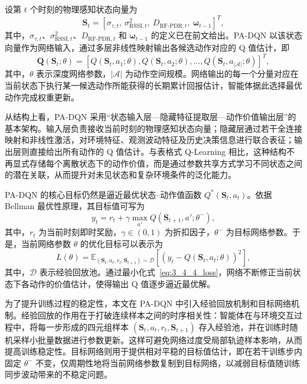 设第 \(t\) 个时刻的物理感知状态向量为
\begin{equation}
\mathbf{S}_t=
\left[
\sigma_{\tau,t},
\ \sigma^2_{\mathrm{RSSI},t},
\ D_{\mathrm{RF\mbox{-}PDR},t},
\ \boldsymbol{\omega}_{t-1}
\right]^T,
\label{eq:3_4_4_state_input}
\end{equation}
其中，\(\sigma_{\tau,t}\)、\(\sigma^2_{\mathrm{RSSI},t}\)、\(D_{\mathrm{RF\mbox{-}PDR},t}\) 和 \(\boldsymbol{\omega}_{t-1}\) 的定义已在前文给出。PA-DQN 以该状态向量作为网络输入，通过多层非线性映射输出各候选动作对应的 Q 值估计，即
\begin{equation}
\mathbf{Q}(\mathbf{S}_t;\theta)
=
\left[
Q(\mathbf{S}_t,a_1;\theta),
Q(\mathbf{S}_t,a_2;\theta),
\ldots,
Q(\mathbf{S}_t,a_{|\mathcal{A}|};\theta)
\right]^T,
\label{eq:3_4_4_q_output}
\end{equation}
其中，\(\theta\) 表示深度网络参数，\(|\mathcal{A}|\) 为动作空间规模。网络输出的每一个分量对应在当前状态下执行某一候选动作所能获得的长期累计回报估计，智能体据此选择最优动作完成权重更新。

从结构上看，PA-DQN 采用“状态输入层—隐藏特征提取层—动作价值输出层”的基本架构。输入层负责接收当前时刻的物理感知状态向量；隐藏层通过若干全连接映射和非线性激活，对环境特征、观测波动特征及历史决策信息进行联合表征；输出层则直接给出所有动作的 Q 值估计。与表格式 Q-Learning 相比，这种结构不再显式存储每个离散状态下的动作价值，而是通过参数共享方式学习不同状态之间的潜在关联，从而提升对未见状态和复杂环境条件的泛化能力。

PA-DQN 的核心目标仍然是逼近最优状态--动作值函数 \(Q^*(\mathbf{S}_t,a_t)\)。依据 Bellman 最优性原理，其目标值可写为
\begin{equation}
y_t
=
r_t+\gamma \max_{a'}Q(\mathbf{S}_{t+1},a';\theta^-),
\label{eq:3_4_4_target}
\end{equation}
其中，\(r_t\) 为当前时刻即时奖励，\(\gamma\in(0,1)\) 为折扣因子，\(\theta^-\) 为目标网络参数。于是，当前网络参数 \(\theta\) 的优化目标可以表示为
\begin{equation}
L(\theta)
=
\mathbb{E}_{(\mathbf{S}_t,a_t,r_t,\mathbf{S}_{t+1})\sim \mathcal{D}}
\left[
\left(
y_t-Q(\mathbf{S}_t,a_t;\theta)
\right)^2
\right],
\label{eq:3_4_4_loss}
\end{equation}
其中，\(\mathcal{D}\) 表示经验回放池。通过最小化式~\eqref{eq:3_4_4_loss}，网络不断修正当前状态下各动作的价值估计，使得输出 Q 值逐步逼近最优解。

为了提升训练过程的稳定性，本文在 PA-DQN 中引入经验回放机制和目标网络机制。经验回放的作用在于打破连续样本之间的时序相关性：智能体在与环境交互过程中，将每一步形成的四元组样本 \((\mathbf{S}_t,a_t,r_t,\mathbf{S}_{t+1})\) 存入经验池，并在训练时随机采样小批量数据进行参数更新。这样可避免网络过度受局部轨迹样本影响，从而提高训练稳定性。目标网络则用于提供相对平稳的目标值估计，即在若干训练步内固定 \(\theta^-\) 不变，仅周期性地将当前网络参数复制到目标网络，以减弱目标值随训练同步波动带来的不稳定问题。

